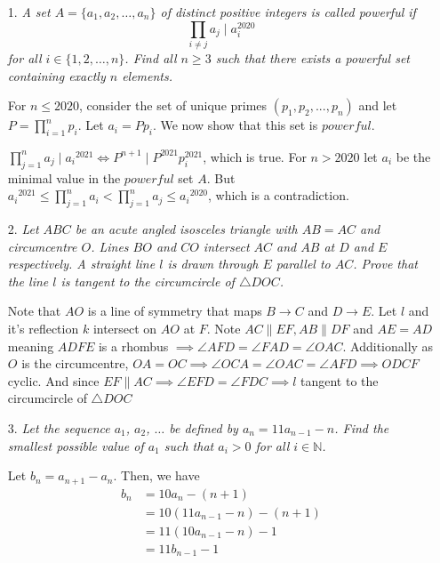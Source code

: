 \documentclass{article}
\begin{document}
\begin{enumerate}

\medskip
\item[1.] %
{\itshape A set $A = \{a_1, a_2, \dotsc, a_n\}$ of distinct positive integers is called \emph{powerful} if
\[ \prod_{i \neq j} a_j \mid a_i^{2020} \]
for all $i \in \{1, 2, \dotsc, n\}$.
Find all $n \ge 3$ such that there exists a powerful set containing exactly $n$ elements.}

For $n\leq2020$, consider the set of unique primes $(p_1,p_2,...,p_n)$ and let $P = \prod_{i=1}^{n} p_i$. Let $a_i = Pp_i$. We now show that this set is $powerful$.

$\prod_{j=1}^{n} a_j \mid {a_i}^{2021} \iff P^{n+1} \mid P^{2021}p_i^{2021}$, which is true.
For $n>2020$ let $a_i$ be the minimal value in the $powerful$ set $A$.
But ${a_i}^{2021} \leq \prod_{j=1}^{n} a_i < \prod_{j=1}^{n} a_j \leq {a_i}^{2020}$, which is a contradiction.


\medskip
\item[2.] %
{\itshape Let $ABC$ be an acute angled isosceles triangle with $AB = AC$ and circumcentre $O$.
Lines $BO$ and $CO$ intersect $AC$ and $AB$ at $D$ and $E$ respectively.
A straight line $l$ is drawn through $E$ parallel to $AC$.
Prove that the line $l$ is tangent to the circumcircle of $\triangle DOC$.}

Note that $AO$ is a line of symmetry that maps $B\rightarrow C$ and $D\rightarrow E$. Let $l$ and it's reflection $k$ intersect on $AO$ at $F$.
Note $AC \parallel EF, AB \parallel DF$ and $AE=AD$ meaning $ADFE$ is a rhombus $\implies \angle AFD = \angle FAD = \angle OAC$.
Additionally as $O$ is the circumcentre, $OA = OC \implies \angle OCA = \angle OAC = \angle AFD \implies ODCF$ cyclic.
And since $EF \parallel AC\implies\angle EFD = \angle FDC\implies l$ tangent to the circumcircle of $\triangle DOC$


\medskip
\item[3.] %
{\itshape Let the sequence $a_1$, $a_2$, $\dotsc$ be defined by $a_n = 11 a_{n - 1} - n$.
Find the smallest possible value of $a_1$ such that $a_i > 0$ for all $i \in \mathbb{N}$.}

Let $b_n = a_{n + 1} - a_n$. Then, we have
\begin{align*}
	b_n &= 10a_n - (n + 1) \\
	 &= 10(11a_{n - 1} - n) - (n + 1) \\
	 &= 11(10a_{n - 1} - n) - 1 \\
	 &= 11b_{n - 1} - 1
\end{align*}


\end{enumerate}
\end{document}
